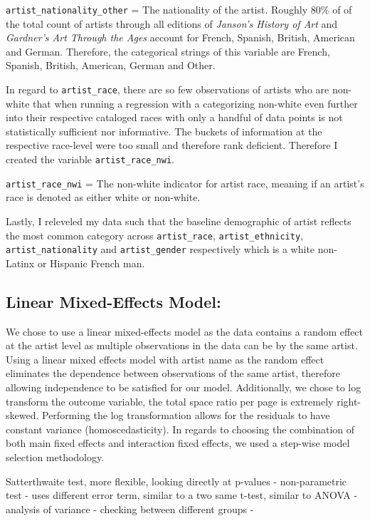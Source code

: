 \documentclass[
  letterpaper,
  DIV=11,
  numbers=noendperiod]{scrreprt}
\begin{document}
\texttt{artist\_nationality\_other} = The nationality of the artist.
Roughly 80\% of of the total count of artists through all editions of
\emph{Janson's History of Art} and \emph{Gardner's Art Through the Ages}
account for French, Spanish, British, American and German. Therefore,
the categorical strings of this variable are French, Spanish, British,
American, German and Other.

In regard to \texttt{artist\_race}, there are so few observations of
artists who are non-white that when running a regression with a
categorizing non-white even further into their respective cataloged
races with only a handful of data points is not statistically sufficient
nor informative. The buckets of information at the respective race-level
were too small and therefore rank deficient. Therefore I created the
variable \texttt{artist\_race\_nwi}.

\texttt{artist\_race\_nwi} = The non-white indicator for artist race,
meaning if an artist's race is denoted as either white or non-white.

Lastly, I releveled my data such that the baseline demographic of artist
reflects the most common category across \texttt{artist\_race},
\texttt{artist\_ethnicity}, \texttt{artist\_nationality} and
\texttt{artist\_gender} respectively which is a white non-Latinx or
Hispanic French man.

\hypertarget{linear-mixed-effects-model}{%
\subsection{Linear Mixed-Effects
Model:}\label{linear-mixed-effects-model}}

We chose to use a linear mixed-effects model as the data contains a
random effect at the artist level as multiple observations in the data
can be by the same artist. Using a linear mixed effects model with
artist name as the random effect eliminates the dependence between
observations of the same artist, therefore allowing independence to be
satisfied for our model. Additionally, we chose to log transform the
outcome variable, the total space ratio per page is extremely
right-skewed. Performing the log transformation allows for the residuals
to have constant variance (homoscedasticity). In regards to choosing the
combination of both main fixed effects and interaction fixed effects, we
used a step-wise model selection methodology.

Satterthwaite test, more flexible, looking directly at p-values -
non-parametric test - uses different error term, similar to a two same
t-test, similar to ANOVA - analysis of variance - checking between
different groups -
\end{document}
